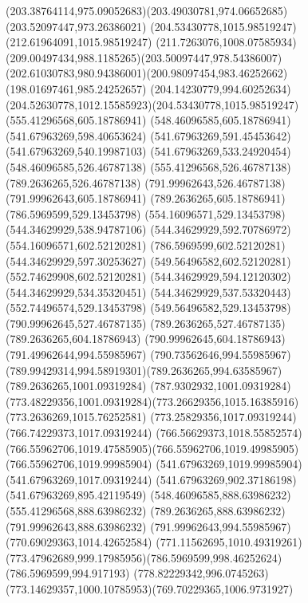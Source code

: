 {{	\curveto(203.38764114,975.09052683)(203.49030781,974.06652685)(203.52097447,973.26386021)
	\moveto(204.53430778,1015.98519247)
	\lineto(212.61964091,1015.98519247)
	\curveto(211.7263076,1008.07585934)(209.00497434,988.1185265)(203.50097447,978.54386007)
	\curveto(202.61030783,980.94386001)(200.98097454,983.46252662)(198.01697461,985.24252657)
	\curveto(204.14230779,994.60252634)(204.52630778,1012.15585923)(204.53430778,1015.98519247)
	\moveto(555.41296568,605.18786941)
	\lineto(548.46096585,605.18786941)
	\lineto(541.67963269,598.40653624)
	\lineto(541.67963269,591.45453642)
	\lineto(541.67963269,540.19987103)
	\lineto(541.67963269,533.24920454)
	\lineto(548.46096585,526.46787138)
	\lineto(555.41296568,526.46787138)
	\lineto(789.2636265,526.46787138)
	\lineto(791.99962643,526.46787138)
	\lineto(791.99962643,605.18786941)
	\lineto(789.2636265,605.18786941)
	\closepath
	\moveto(786.5969599,529.13453798)
	\lineto(554.16096571,529.13453798)
	\lineto(544.34629929,538.94787106)
	\lineto(544.34629929,592.70786972)
	\lineto(554.16096571,602.52120281)
	\lineto(786.5969599,602.52120281)
	\closepath
	\moveto(544.34629929,597.30253627)
	\lineto(549.56496582,602.52120281)
	\lineto(552.74629908,602.52120281)
	\lineto(544.34629929,594.12120302)
	\closepath
	\moveto(544.34629929,534.35320451)
	\lineto(544.34629929,537.53320443)
	\lineto(552.74496574,529.13453798)
	\lineto(549.56496582,529.13453798)
	\closepath
	\moveto(790.99962645,527.46787135)
	\lineto(789.2636265,527.46787135)
	\lineto(789.2636265,604.18786943)
	\lineto(790.99962645,604.18786943)
	\closepath
	\moveto(791.49962644,994.55985967)
	\curveto(790.73562646,994.55985967)(789.99429314,994.58919301)(789.2636265,994.63585967)
	\lineto(789.2636265,1001.09319284)
	\lineto(787.9302932,1001.09319284)
	\curveto(773.48229356,1001.09319284)(773.26629356,1015.16385916)(773.2636269,1015.76252581)
	\lineto(773.25829356,1017.09319244)
	\lineto(766.74229373,1017.09319244)
	\curveto(766.56629373,1018.55852574)(766.55962706,1019.47585905)(766.55962706,1019.49985905)
	\lineto(766.55962706,1019.99985904)
	\lineto(541.67963269,1019.99985904)
	\lineto(541.67963269,1017.09319244)
	\lineto(541.67963269,902.37186198)
	\lineto(541.67963269,895.42119549)
	\lineto(548.46096585,888.63986232)
	\lineto(555.41296568,888.63986232)
	\lineto(789.2636265,888.63986232)
	\lineto(791.99962643,888.63986232)
	\lineto(791.99962643,994.55985967)
	\closepath
	\moveto(770.69029363,1014.42652584)
	\curveto(771.11562695,1010.49319261)(773.47962689,999.17985956)(786.5969599,998.46252624)
	\lineto(786.5969599,994.917193)
	\curveto(778.82229342,996.0745263)(773.14629357,1000.10785953)(769.70229365,1006.9731927)
}}
